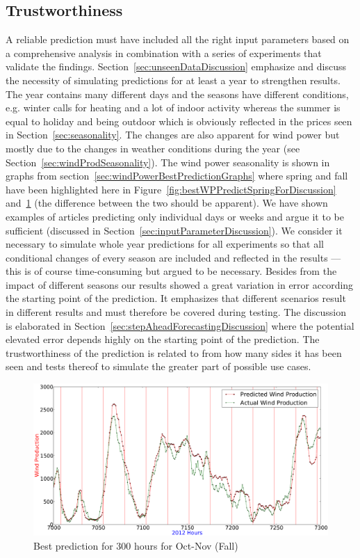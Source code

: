 \subsection{Trustworthiness}
A reliable prediction must have included all the right input parameters based on a comprehensive analysis in combination with a series of experiments that validate the findings. Section~\ref{sec:unseenDataDiscussion} emphasize and discuss the necessity of simulating predictions for at least a year to strengthen results. The year contains many different days and the seasons have different conditions, e.g. winter calls for heating and a lot of indoor activity whereas the summer is equal to holiday and being outdoor which is obviously reflected in the prices seen in Section~\ref{sec:seasonality}. The changes are also apparent for wind power but mostly due to the changes in weather conditions during the year (see Section~\ref{sec:windProdSeasonality}). The wind power seasonality is shown in graphs from section~\ref{sec:windPowerBestPredictionGraphs} where spring and fall have been highlighted here in Figure~\ref{fig:bestWPPredictSpringForDiscussion} and~\ref{fig:bestPredictWPFallForDiscussion} (the difference between the two should be apparent). We have shown examples of articles predicting only individual days or weeks and argue it to be sufficient (discussed in Section~\ref{sec:inputParameterDiscussion}). We consider it necessary to simulate whole year predictions for all experiments so that all conditional changes of every season are included and reflected in the results --- this is of course time-consuming but argued to be necessary. Besides from the impact of different seasons our results showed a great variation in error according the starting point of the prediction. It emphasizes that different scenarios result in different results and must therefore be covered during testing. The discussion is elaborated in Section~\ref{sec:stepAheadForecastingDiscussion} where the potential elevated error depends highly on the starting point of the prediction. The trustworthiness of the prediction is related to from how many sides it has been seen and tests thereof to simulate the greater part of possible use cases. 

\begin{figure}[H]
\centering
\includegraphics[width=0.99\linewidth]{billeder/bestPossiblePredictionWindProduction7000-7300_Fall.png}
\caption{Best prediction for 300 hours for Oct-Nov (Fall)}
\label{fig:bestPredictWPFallForDiscussion}
\end{figure}

